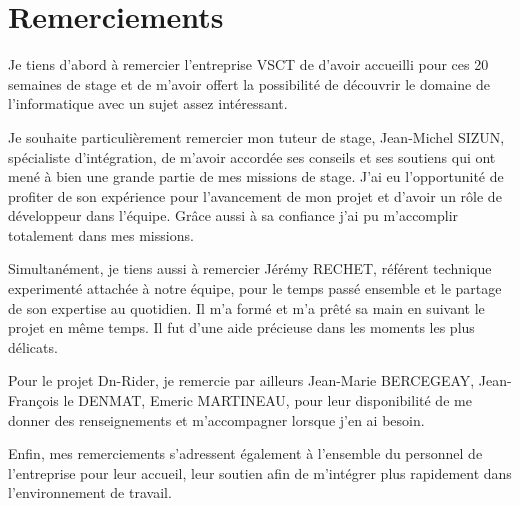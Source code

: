 \chapter*{Remerciements}

Je tiens d’abord à remercier l’entreprise VSCT de d’avoir accueilli pour ces 20 semaines de stage
et de m’avoir offert la possibilité de découvrir le domaine de l'informatique avec un sujet assez intéressant.

Je souhaite particulièrement remercier mon tuteur de stage, Jean-Michel SIZUN, spécialiste d'intégration,
de m’avoir accordée ses conseils et ses soutiens qui ont mené à bien une grande partie de mes missions de stage.
J’ai eu l’opportunité de profiter de son expérience pour l’avancement de mon projet et d'avoir un rôle de développeur dans l'équipe.
Grâce aussi à sa confiance j'ai pu m'accomplir totalement dans mes missions.

Simultanément, je tiens aussi à remercier Jérémy RECHET, référent technique experimenté attachée à notre équipe,
pour le temps passé ensemble et le partage de son expertise au quotidien.
Il m’a formé et m’a prêté sa main en suivant le projet en même temps.
Il fut d'une aide précieuse dans les moments les plus délicats.

Pour le projet Dn-Rider, je remercie par ailleurs Jean-Marie BERCEGEAY, Jean-François le DENMAT, Emeric MARTINEAU, pour leur disponibilité de me donner des
renseignements et m’accompagner lorsque j'en ai besoin.

Enfin, mes remerciements s’adressent également à l’ensemble du personnel de l’entreprise
pour leur accueil, leur soutien afin de m’intégrer plus rapidement dans l’environnement de travail.
